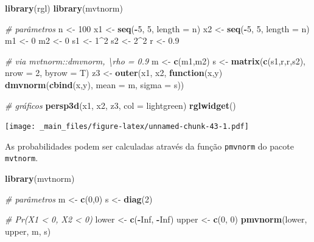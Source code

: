\documentclass[
]{book}
\newenvironment{Shaded}{\begin{snugshade}}{\end{snugshade}}
\newcommand{\CommentTok}[1]{\textcolor[rgb]{0.56,0.35,0.01}{\textit{#1}}}
\newcommand{\ControlFlowTok}[1]{\textcolor[rgb]{0.13,0.29,0.53}{\textbf{#1}}}
\newcommand{\DataTypeTok}[1]{\textcolor[rgb]{0.13,0.29,0.53}{#1}}
\newcommand{\DecValTok}[1]{\textcolor[rgb]{0.00,0.00,0.81}{#1}}
\newcommand{\FloatTok}[1]{\textcolor[rgb]{0.00,0.00,0.81}{#1}}
\newcommand{\KeywordTok}[1]{\textcolor[rgb]{0.13,0.29,0.53}{\textbf{#1}}}
\newcommand{\NormalTok}[1]{#1}
\newcommand{\OperatorTok}[1]{\textcolor[rgb]{0.81,0.36,0.00}{\textbf{#1}}}
\newcommand{\OtherTok}[1]{\textcolor[rgb]{0.56,0.35,0.01}{#1}}
\newcommand{\StringTok}[1]{\textcolor[rgb]{0.31,0.60,0.02}{#1}}
\theoremstyle{definition}
\theoremstyle{definition}
\theoremstyle{definition}
\theoremstyle{remark}
\begin{document}
\begin{Shaded}
\begin{Highlighting}[]
\KeywordTok{library}\NormalTok{(rgl)}
\KeywordTok{library}\NormalTok{(mvtnorm)}

\CommentTok{\# parâmetros}
\NormalTok{n \textless{}{-}}\StringTok{ }\DecValTok{100}
\NormalTok{x1 \textless{}{-}}\StringTok{ }\KeywordTok{seq}\NormalTok{(}\OperatorTok{{-}}\DecValTok{5}\NormalTok{, }\DecValTok{5}\NormalTok{, }\DataTypeTok{length =}\NormalTok{ n)}
\NormalTok{x2 \textless{}{-}}\StringTok{ }\KeywordTok{seq}\NormalTok{(}\OperatorTok{{-}}\DecValTok{5}\NormalTok{, }\DecValTok{5}\NormalTok{, }\DataTypeTok{length =}\NormalTok{ n)}
\NormalTok{m1 \textless{}{-}}\StringTok{ }\DecValTok{0}
\NormalTok{m2 \textless{}{-}}\StringTok{ }\DecValTok{0}
\NormalTok{s1 \textless{}{-}}\StringTok{ }\DecValTok{1}\OperatorTok{\^{}}\DecValTok{2}
\NormalTok{s2 \textless{}{-}}\StringTok{ }\DecValTok{2}\OperatorTok{\^{}}\DecValTok{2}
\NormalTok{r \textless{}{-}}\StringTok{ }\FloatTok{0.9}

\CommentTok{\# via mvtnorm::dmvnorm, \textbackslash{}rho = 0.9}
\NormalTok{m \textless{}{-}}\StringTok{ }\KeywordTok{c}\NormalTok{(m1,m2)}
\NormalTok{s \textless{}{-}}\StringTok{ }\KeywordTok{matrix}\NormalTok{(}\KeywordTok{c}\NormalTok{(s1,r,r,s2), }\DataTypeTok{nrow =} \DecValTok{2}\NormalTok{, }\DataTypeTok{byrow =}\NormalTok{ T)}
\NormalTok{z3 \textless{}{-}}\StringTok{ }\KeywordTok{outer}\NormalTok{(x1, x2, }\ControlFlowTok{function}\NormalTok{(x,y) }\KeywordTok{dmvnorm}\NormalTok{(}\KeywordTok{cbind}\NormalTok{(x,y), }\DataTypeTok{mean =}\NormalTok{ m, }\DataTypeTok{sigma =}\NormalTok{ s))}

\CommentTok{\# gráficos}
\KeywordTok{persp3d}\NormalTok{(x1, x2, z3, }\DataTypeTok{col =} \StringTok{\textquotesingle{}lightgreen\textquotesingle{}}\NormalTok{)}
\KeywordTok{rglwidget}\NormalTok{()}
\end{Highlighting}
\end{Shaded}

\texttt{[image: \_main\_files/figure-latex/unnamed-chunk-43-1.pdf]}

As probabilidades podem ser calculadas através da função \texttt{pmvnorm} do pacote \texttt{mvtnorm}.

\begin{Shaded}
\begin{Highlighting}[]
\KeywordTok{library}\NormalTok{(mvtnorm)}

\CommentTok{\# parâmetros}
\NormalTok{m \textless{}{-}}\StringTok{ }\KeywordTok{c}\NormalTok{(}\DecValTok{0}\NormalTok{,}\DecValTok{0}\NormalTok{)}
\NormalTok{s \textless{}{-}}\StringTok{ }\KeywordTok{diag}\NormalTok{(}\DecValTok{2}\NormalTok{)}

\CommentTok{\# Pr(X1 \textless{} 0, X2 \textless{} 0)}
\NormalTok{lower \textless{}{-}}\StringTok{ }\KeywordTok{c}\NormalTok{(}\OperatorTok{{-}}\OtherTok{Inf}\NormalTok{, }\OperatorTok{{-}}\OtherTok{Inf}\NormalTok{)}
\NormalTok{upper \textless{}{-}}\StringTok{ }\KeywordTok{c}\NormalTok{(}\DecValTok{0}\NormalTok{, }\DecValTok{0}\NormalTok{)}
\KeywordTok{pmvnorm}\NormalTok{(lower, upper, m, s)}
\end{Highlighting}
\end{Shaded}
\end{document}
